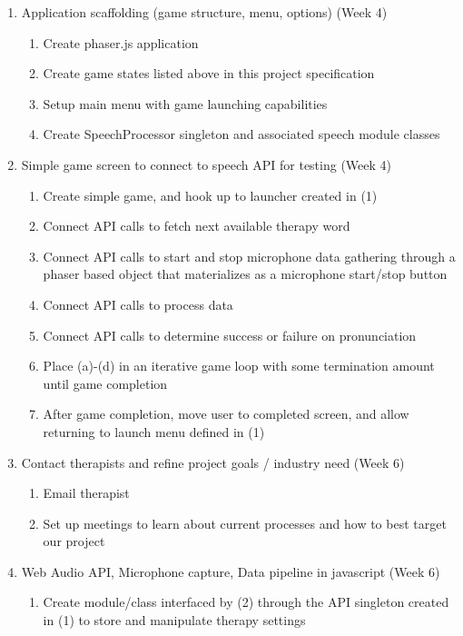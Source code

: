 \documentclass{article}
\begin{document}
\begin{enumerate}
    \item Application scaffolding (game structure, menu, options) (Week 4)
    \begin{enumerate}
        \item Create phaser.js application
        \item Create game states listed above in this project specification
        \item Setup main menu with game launching capabilities
        \item Create SpeechProcessor singleton and associated speech module classes
    \end{enumerate}
    \item Simple game screen to connect to speech API for testing (Week 4)
    \begin{enumerate}
        \item Create simple game, and hook up to launcher created in (1)
        \item Connect API calls to fetch next available therapy word
        \item Connect API calls to start and stop microphone data gathering through a phaser based object that materializes as a microphone start/stop button
        \item Connect API calls to process data
        \item Connect API calls to determine success or failure on pronunciation
        \item Place (a)-(d) in an iterative game loop with some termination amount until game completion
        \item After game completion, move user to completed screen, and allow returning to launch menu defined in (1)
    \end{enumerate}
    \item Contact therapists and refine project goals / industry need (Week 6)
    \begin{enumerate}
        \item Email therapist
        \item Set up meetings to learn about current processes and how to best target our project
    \end{enumerate}
    \item Web Audio API, Microphone capture, Data pipeline in javascript (Week 6)
    \begin{enumerate}
        \item Create module/class interfaced by (2) through the API singleton created in (1) to store and manipulate therapy settings

\end{enumerate}
\end{enumerate}
\end{document}
